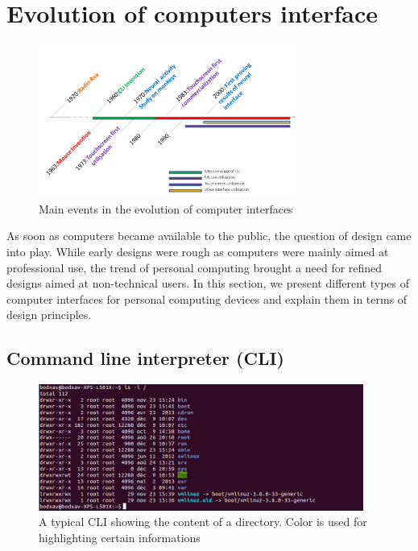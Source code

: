 \documentclass[a4paper,11pt] {article}
\theoremstyle{definition}
\begin{document}
\newpage

\section{Evolution of computers interface}
\label{sct:history}

    \begin{figure}[h]
        \centering
        \includegraphics[width=0.75\textwidth]{fig-report/timeline-interface.png}
        \caption{Main events in the evolution of computer interfaces}
        \label{fig:timeline}
    \end{figure}

    As soon as computers became available to the public, the question of design came into play. While early designs were rough as computers were mainly aimed at professional use, the trend of personal computing brought a need for refined designs aimed at non-technical users. In this section, we present different types of computer interfaces for personal computing devices and explain them in terms of design principles.

    \subsection{Command line interpreter (CLI)}

    \begin{figure}[h]
        \centering
        \includegraphics[width=0.95\textwidth]{fig-report/terminal.png}
        \caption{A typical CLI showing the content of a directory. Color is used for highlighting certain informations}
        \label{fig:cli}
    \end{figure}
\end{document}
